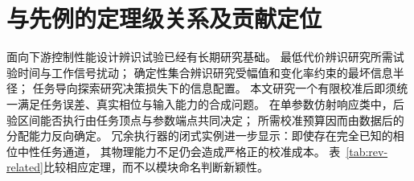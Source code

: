 \documentclass[11pt,a4paper]{article}
\numberwithin{equation}{section}
\theoremstyle{definition}
\begin{document}
\section{与先例的定理级关系及贡献定位}
\label{sec:rev-related}

面向下游控制性能设计辨识试验已经有长期研究基础。
最低代价辨识研究所需试验时间与工作信号扰动\cite{bombois2006}；
确定性集合辨识研究受幅值和变化率约束的最坏信息半径\cite{tanaskovic2014}；
任务导向探索研究决策损失下的信息配置\cite{wagenmaker2021}。
本文研究一个有限校准后即须统一满足任务误差、真实相位与输入能力的合成问题。
在单参数仿射响应类中，后验区间能否执行由任务顶点与参数端点共同决定；
所需校准预算因而由数据后的分配能力反向确定。
冗余执行器的闭式实例进一步显示：即使存在完全已知的相位中性任务通道，
其物理能力不足仍会造成严格正的校准成本。
表~\ref{tab:rev-related}比较相应定理，而不以模块命名判断新颖性。
\end{document}
